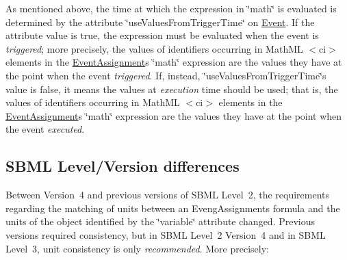 As mentioned above, the time at which the expression in \char`\"{}math\char`\"{} is evaluated is determined by the attribute \char`\"{}use\+Values\+From\+Trigger\+Time\char`\"{} on \hyperlink{class_event}{Event}. If the attribute value is {\ttfamily true}, the expression must be evaluated when the event is {\itshape triggered}; more precisely, the values of identifiers occurring in Math\+ML {\ttfamily $<$ci$>$} elements in the \hyperlink{class_event_assignment}{Event\+Assignment}\textquotesingle{}s \char`\"{}math\char`\"{} expression are the values they have at the point when the event {\itshape triggered}. If, instead, \char`\"{}use\+Values\+From\+Trigger\+Time\char`\"{}\textquotesingle{}s value is {\ttfamily false}, it means the values at {\itshape execution} time should be used; that is, the values of identifiers occurring in Math\+ML {\ttfamily $<$ci$>$} elements in the \hyperlink{class_event_assignment}{Event\+Assignment}\textquotesingle{}s \char`\"{}math\char`\"{} expression are the values they have at the point when the event {\itshape executed}.\hypertarget{class_event_assignment_eventassignment-version-diffs}{}\subsection{S\+B\+M\+L Level/\+Version differences}\label{class_event_assignment_eventassignment-version-diffs}
Between Version~4 and previous versions of S\+B\+ML Level~2, the requirements regarding the matching of units between an Eveng\+Assignment\textquotesingle{}s formula and the units of the object identified by the \char`\"{}variable\char`\"{} attribute changed. Previous versions required consistency, but in S\+B\+ML Level~2 Version~4 and in S\+B\+ML Level~3, unit consistency is only {\itshape recommended}. More precisely\+: 
